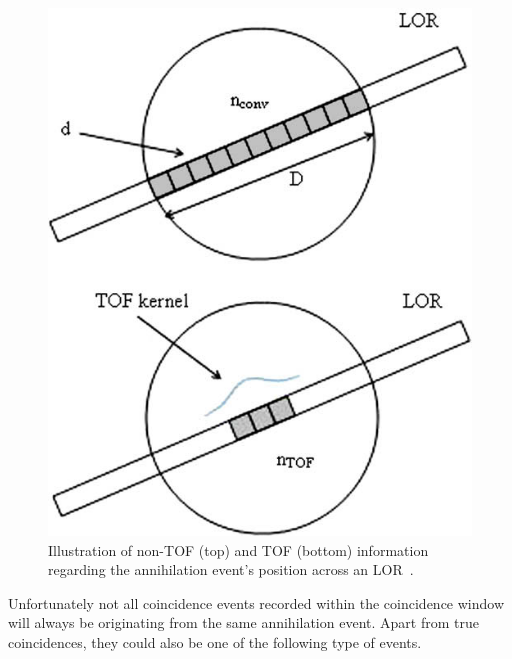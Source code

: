 \begin{figure} [h!]
\centering
\includegraphics[scale=0.55,angle=0]{2_Theory_Methods/figures/TOF_bin.png}
\caption{Illustration of non-TOF (top) and TOF (bottom) information regarding the annihilation event's position across an LOR~\cite{Conti2009}.} 
\label{fig_2:TOF_bin}
\end{figure} 
%
Unfortunately not all coincidence events recorded within the coincidence window will always be originating from the same annihilation event. Apart from true coincidences, they could also be one of the following type of events. 
%
